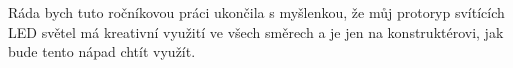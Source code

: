 Ráda bych tuto ročníkovou práci ukončila s myšlenkou, že můj protoryp svítících LED světel má kreativní využití ve všech směrech a je jen na konstruktérovi, jak bude tento nápad chtít využít. 



\newpage